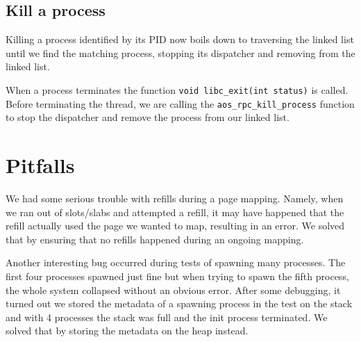 \subsection{Kill a process} 
Killing a process identified by its PID now boils down to traversing the linked list until we find the matching process, stopping its dispatcher and removing from the linked list.

When a process terminates the function \verb|void libc_exit(int status)| is called. Before terminating the thread, we are calling the \verb|aos_rpc_kill_process| function to stop the dispatcher and remove the process from our linked list.


\section{Pitfalls} 

We had some serious trouble with refills during a page
mapping. Namely, when we ran out of slots/slabs and attempted a refill, it may have 
happened that the refill actually used the page we wanted to map, resulting in an
error. We solved that by ensuring that no refills happened during an ongoing
mapping.

Another interesting bug occurred during tests of spawning many processes. The first four processes spawned just fine but when trying to spawn the fifth process, the whole system collapsed without an obvious error. After some debugging, it turned out we stored the metadata of a spawning process in the test on the stack and with 4 processes the stack was full and the init process terminated. We solved that by storing the metadata on the heap instead.

